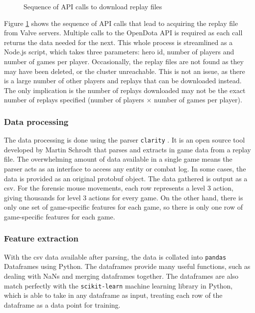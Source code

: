 \documentclass{../sty/SizheArticle}
\begin{document}
\begin{figure}[H]
\caption{Sequence of API calls to download  replay files}
\label{fig:api-calls}
\end{figure}

Figure \ref{fig:api-calls} shows the sequence of API calls that lead to acquiring the replay file from Valve servers. Multiple calls to the OpenDota API is required as each call returns the data needed for the next. This whole process is streamlined as a Node.js script, which takes three parameters: hero id, number of players and number of games per player. Occasionally, the replay files are not found as they may have been deleted, or the cluster unreachable. This is not an issue, as there is a large number of other players and replays that can be downloaded instead. The only implication is the number of replays downloaded may not be the exact number of replays specified (number of players $\times$ number of games per player).

\subsubsection{Data processing}
The data processing is done using the parser \texttt{clarity} \cite{clarity}. It is an open source tool developed by Martin Schrodt that parses and extracts in game data from a replay file. The overwhelming amount of data available in a single game means the parser acts as an interface to access any entity or combat log. In some cases, the data is provided as an original protobuf object. The data gathered is output as a csv. For the forensic mouse movements, each row represents a level 3 action, giving thousands for level 3 actions for every game. On the other hand, there is only one set of game-specific features for each game, so there is only one row of game-specific features for each game. 


\subsubsection{Feature extraction}
With the csv data available after parsing, the data is collated into \texttt{pandas} Dataframes using Python. The dataframes provide many useful functions, such as dealing with NaNs and merging dataframes together. The dataframes are also match perfectly with the \texttt{scikit-learn} machine learning library in Python, which is able to take in any dataframe as input, treating each row of the dataframe as a data point for training. 
\end{document}
